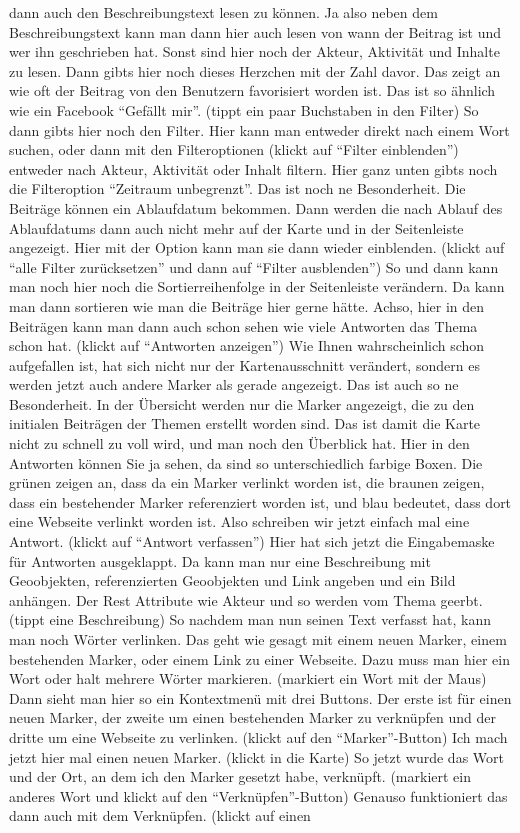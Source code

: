 \begin{itemize}
dann auch den Beschreibungstext lesen zu k{\"o}nnen. Ja also neben dem Beschreibungstext kann man dann hier auch lesen von wann der Beitrag ist und wer ihn geschrieben hat. Sonst sind hier noch der Akteur, Aktivit{\"a}t und Inhalte zu lesen. Dann gibts hier noch dieses Herzchen mit der Zahl davor. Das zeigt an wie oft der Beitrag von den Benutzern favorisiert worden ist. Das ist so {\"a}hnlich wie ein Facebook "`Gef{\"a}llt mir"'. (tippt ein paar Buchstaben in den Filter) So dann gibts hier noch den Filter. Hier kann man entweder direkt nach einem Wort suchen, oder dann mit den Filteroptionen (klickt auf "`Filter einblenden"') entweder nach Akteur, Aktivit{\"a}t oder Inhalt filtern. Hier ganz unten gibts noch die Filteroption "`Zeitraum unbegrenzt"'. Das ist noch ne Besonderheit. Die Beitr{\"a}ge k{\"o}nnen ein Ablaufdatum bekommen. Dann werden die nach Ablauf des Ablaufdatums dann auch nicht mehr auf der Karte und in der Seitenleiste angezeigt. Hier mit der Option kann man sie dann wieder einblenden. (klickt auf "`alle Filter zur{\"u}cksetzen"' und dann auf "`Filter ausblenden"') So und dann kann man noch hier noch die Sortierreihenfolge in der Seitenleiste ver{\"a}ndern. Da kann man dann sortieren wie man die Beitr{\"a}ge hier gerne h{\"a}tte. Achso, hier in den Beitr{\"a}gen kann man dann auch schon sehen wie viele Antworten das Thema schon hat. (klickt auf "`Antworten anzeigen"') Wie Ihnen wahrscheinlich schon aufgefallen ist, hat sich nicht nur der Kartenausschnitt ver{\"a}ndert, sondern es werden jetzt auch andere Marker als gerade angezeigt. Das ist auch so ne Besonderheit. In der {\"U}bersicht werden nur die Marker angezeigt, die zu den initialen Beitr{\"a}gen der Themen erstellt worden sind. Das ist damit die Karte nicht zu schnell zu voll wird, und man noch den {\"U}berblick hat. Hier in den Antworten k{\"o}nnen Sie ja sehen, da sind so unterschiedlich farbige Boxen. Die gr{\"u}nen zeigen an, dass da ein Marker verlinkt worden ist, die braunen zeigen, dass ein bestehender Marker referenziert worden ist, und blau bedeutet, dass dort eine Webseite verlinkt worden ist. Also schreiben wir jetzt einfach mal eine Antwort. (klickt auf "`Antwort verfassen"') Hier hat sich jetzt die Eingabemaske f{\"u}r Antworten ausgeklappt. Da kann man nur eine Beschreibung mit Geoobjekten, referenzierten Geoobjekten und Link angeben und ein Bild anh{\"a}ngen. Der Rest Attribute wie Akteur und so werden vom Thema geerbt. (tippt eine Beschreibung) So nachdem man nun seinen Text verfasst hat, kann man noch W{\"o}rter verlinken. Das geht wie gesagt mit einem neuen Marker, einem bestehenden Marker, oder einem Link zu einer Webseite. Dazu muss man hier ein Wort oder halt mehrere W{\"o}rter markieren. (markiert ein Wort mit der Maus) Dann sieht man hier so ein Kontextmen{\"u} mit drei Buttons. Der erste ist f{\"u}r einen neuen Marker, der zweite um einen bestehenden Marker zu verkn{\"u}pfen und der dritte um eine Webseite zu verlinken. (klickt auf den "`Marker"'-Button) Ich mach jetzt hier mal einen neuen Marker. (klickt in die Karte) So jetzt wurde das Wort und der Ort, an dem ich den Marker gesetzt habe, verkn{\"u}pft. (markiert ein anderes Wort und klickt auf den "`Verkn{\"u}pfen"'-Button) Genauso funktioniert das dann auch mit dem Verkn{\"u}pfen. (klickt auf einen 
\end{itemize}
